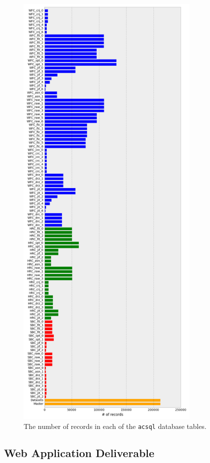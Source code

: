 \documentclass[10pt,journal,compsoc]{IEEEtran}
\begin{document}
\begin{figure}[!t]
\centering
\includegraphics[width=3.5in]{./figures/database_records.png}
\caption{The number of records in each of the \texttt{acsql} database tables.}
\label{fig1}
\end{figure}


\subsection{Web Application Deliverable}
\end{document}
